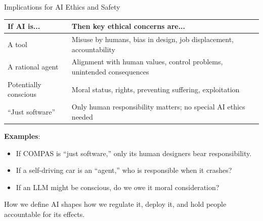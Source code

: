 \documentclass[aspectratio=169,11pt]{beamer}
\begin{document}
\begin{frame}{Implications for AI Ethics and Safety}
\begin{table}[h]
\centering
\scriptsize
\begin{tabular}{@{}p{3.5cm}p{8.5cm}@{}}
\toprule
\textbf{If AI is...} & \textbf{Then key ethical concerns are...} \\
\midrule
A tool & Misuse by humans, bias in design, job displacement, accountability \\
\addlinespace
A rational agent & Alignment with human values, control problems, unintended consequences \\
\addlinespace
Potentially conscious & Moral status, rights, preventing suffering, exploitation \\
\addlinespace
``Just software'' & Only human responsibility matters; no special AI ethics needed \\
\bottomrule
\end{tabular}
\end{table}

\vspace{0.2em}
\textbf{Examples}:
\begin{itemize}
    \item If COMPAS is ``just software,'' only its human designers bear responsibility.
    \item If a self-driving car is an ``agent,'' who is responsible when it crashes?
    \item If an LLM might be conscious, do we owe it moral consideration?
\end{itemize}

\vspace{0.1em}
How we define AI shapes how we regulate it, deploy it, and hold people accountable for its effects.
\end{frame}
\end{document}
